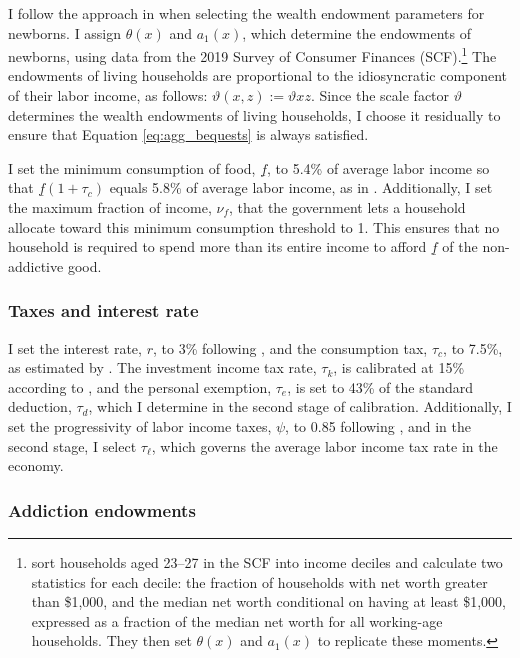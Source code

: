 \documentclass[parskip=full]{article}
\begin{document}
I follow the approach in \citet{rs-2023} when selecting the wealth endowment parameters for newborns. I assign $\theta(x)$ and $a_1(x)$, which determine the endowments of newborns, using data from the 2019 Survey of Consumer Finances (SCF).\footnote{\citet{rs-2023} sort households aged 23–27 in the SCF into income deciles and calculate two statistics for each decile: the fraction of households with net worth greater than \$1,000, and the median net worth conditional on having at least \$1,000, expressed as a fraction of the median net worth for all working-age households. They then set $\theta(x)$ and $a_1(x)$ to replicate these moments.} The endowments of living households are proportional to the idiosyncratic component of their labor income, as follows: $\vartheta(x,z):=\vartheta x z$. Since the scale factor $\vartheta$ determines the wealth endowments of living households, I choose it residually to ensure that Equation \eqref{eq:agg_bequests} is always satisfied. 

I set the minimum consumption of food, $\underline{f}$, to 5.4\% of average labor income so that $\underline{f}(1+\tau_{c})$ equals 5.8\% of average labor income, as in \citet{az-2024}. Additionally, I set the maximum fraction of income, $\nu_{f}$, that the government lets a household allocate toward this minimum consumption threshold to 1. This ensures that no household is required to spend more than its entire income to afford $\underline{f}$ of the non-addictive good.

\subsubsection{Taxes and interest rate}

I set the interest rate, $r$, to 3\% following \citet{kaplanetal-2019}, and the consumption tax, $\tau_{c}$, to 7.5\%, as estimated by \citet{mcdaniel-2007}. The investment income tax rate, $\tau_{k}$, is calibrated at 15\% according to \citet{kkk-2021}, and the personal exemption, $\tau_{e}$, is set to 43\% of the standard deduction, $\tau_{d}$, which I determine in the second stage of calibration. Additionally, I set the progressivity of labor income taxes, $\psi$, to 0.85 following \citet{hsv-2014}, and in the second stage, I select $\tau_{\ell}$, which governs the average labor income tax rate in the economy.

\subsubsection{Addiction endowments}
\end{document}
